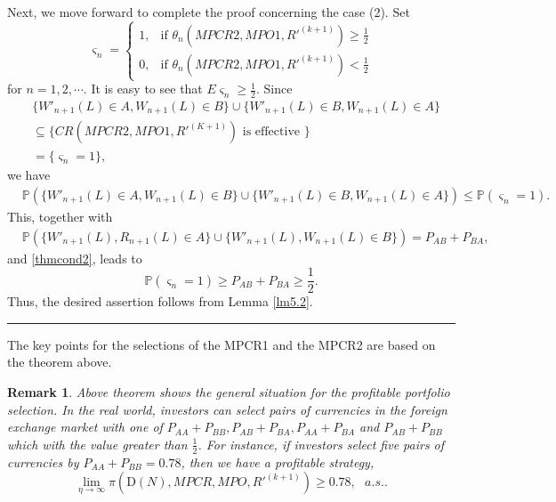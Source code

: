 \documentclass[11pt]{article}
\newtheorem{remark}{Remark}[section]
\newcommand{\fin}{\hspace*{\fill}\rule{0.3em}{1ex}}
\newenvironment{proof}{{\bf \noindent Proof.}}{\fin}
\numberwithin{equation}{section}
\begin{document}
\begin{proof}
Next, we move forward to complete the proof concerning the case (2).  Set \begin{equation*}
\varsigma_n=
\begin{cases}
1, & \text{if } \theta_n(MPCR2,MPO1,R'^{(k+1)}) \geq \frac{1}{2} \\
0,  & \text{if } \theta_n(MPCR2,MPO1,R'^{(k+1)}) < \frac{1}{2}
\end{cases}
\end{equation*}
for $n=1,2,\cdots$.  It is easy to see that $E\varsigma_n\ge\frac{1}{2}$. Since
\begin{equation*}
\begin{split}
&\{W'_{n+1}(L)\in A,W_{n+1}(L)\in B\}\cup \{W'_{n+1}(L)\in B,W_{n+1}(L)\in A\}\\
&\subseteq\{CR(MPCR2, MPO1,R'^{(K+1)})  \mbox{ is effective }\}\\
&=\{\varsigma_n=1\},
\end{split}
\end{equation*}
we have 
\begin{equation*} 
\begin{split}
&\mathbb{P}(\{W'_{n+1}(L)\in A,W_{n+1}(L)\in B\}\cup \{W'_{n+1}(L)\in B,W_{n+1}(L)\in A\})
\le \mathbb{P}(\varsigma_n=1).
\end{split}
\end{equation*}
This, together with 
\begin{equation*}
\begin{split}
&\mathbb{P}(\{W'_{n+1}(L),R_{n+1}(L)\in A\}\cup \{W'_{n+1}(L),W_{n+1}(L)\in B\})
=P_{AB}+P_{BA},
\end{split}
\end{equation*}
and  \eqref{thmcond2}, leads to 
\begin{equation*}
\mathbb{P}(\varsigma_n=1)\geq P_{AB}+P_{BA}\geq\frac{1}{2}.
\end{equation*}
Thus, the desired assertion follows from Lemma \ref{lm5.2}. 
\end{proof}
 
The key points  for the selections of the MPCR1 and the MPCR2 are based on the theorem above.
 
\begin{remark}
Above theorem shows the general situation for the profitable portfolio selection. In the real world, investors can select  pairs of currencies in the foreign exchange market with one of $P_{AA}+P_{BB},P_{AB}+P_{BA},P_{AA}+P_{BA}$ and $P_{AB}+P_{BB}$ which with the value greater than $\frac{1}{2}$. For instance, if investors select five pairs of currencies by $P_{AA}+P_{BB}=0.78$, then we have a profitable strategy,
\begin{equation}
\lim_{\eta \rightarrow\infty}\pi(\text{\'{D}}(N),MPCR,MPO,R'^{(k+1)})\geq 0.78, \text{ } a.s..\end{equation}
\end{remark}
 
\end{document}
